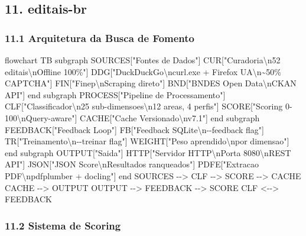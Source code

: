 \documentclass[
  12pt,
]{article}
\newenvironment{Shaded}{}{}
\newcommand{\NormalTok}[1]{#1}
\begin{document}
\subsection{11. editais-br}\label{editais-br}

\subsubsection{11.1 Arquitetura da Busca de
Fomento}\label{arquitetura-da-busca-de-fomento}

\begin{Shaded}
\begin{Highlighting}[]
\NormalTok{flowchart TB}
\NormalTok{subgraph SOURCES["Fontes de Dados"]}
\NormalTok{CUR["Curadoria\textbackslash{}n52 editais\textbackslash{}nOffline 100\%"]}
\NormalTok{DDG["DuckDuckGo\textbackslash{}ncurl.exe + Firefox UA\textbackslash{}n\textasciitilde{}50\% CAPTCHA"]}
\NormalTok{FIN["Finep\textbackslash{}nScraping direto"]}
\NormalTok{BND["BNDES Open Data\textbackslash{}nCKAN API"]}
\NormalTok{end}
\NormalTok{subgraph PROCESS["Pipeline de Processamento"]}
\NormalTok{CLF["Classificador\textbackslash{}n25 sub{-}dimensoes\textbackslash{}n12 areas, 4 perfis"]}
\NormalTok{SCORE["Scoring 0{-}100\textbackslash{}nQuery{-}aware"]}
\NormalTok{CACHE["Cache Versionado\textbackslash{}nv7.1"]}
\NormalTok{end}
\NormalTok{subgraph FEEDBACK["Feedback Loop"]}
\NormalTok{FB["Feedback SQLite\textbackslash{}n{-}{-}feedback flag"]}
\NormalTok{TR["Treinamento\textbackslash{}n{-}{-}treinar flag"]}
\NormalTok{WEIGHT["Peso aprendido\textbackslash{}npor dimensao"]}
\NormalTok{end}
\NormalTok{subgraph OUTPUT["Saida"]}
\NormalTok{HTTP["Servidor HTTP\textbackslash{}nPorta 8080\textbackslash{}nREST API"]}
\NormalTok{JSON["JSON Score\textbackslash{}nResultados ranqueados"]}
\NormalTok{PDFE["Extracao PDF\textbackslash{}npdfplumber + docling"]}
\NormalTok{end}
\NormalTok{SOURCES {-}{-}\textgreater{} CLF {-}{-}\textgreater{} SCORE {-}{-}\textgreater{} CACHE}
\NormalTok{CACHE {-}{-}\textgreater{} OUTPUT}
\NormalTok{OUTPUT {-}{-}\textgreater{} FEEDBACK {-}{-}\textgreater{} SCORE}
\NormalTok{CLF \textless{}{-}{-}\textgreater{} FEEDBACK}
\end{Highlighting}
\end{Shaded}

\subsubsection{11.2 Sistema de Scoring}\label{sistema-de-scoring}
\end{document}
